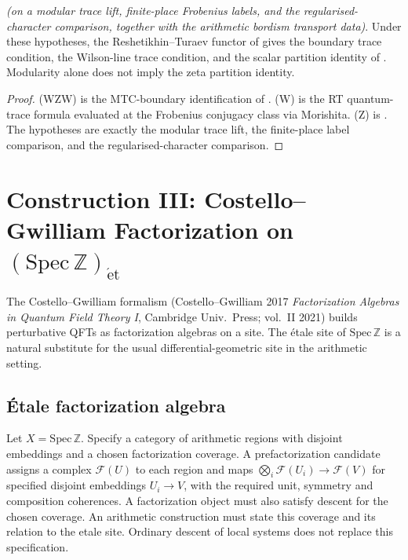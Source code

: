 \begin{theorem}
\label{v4-arith:w10-a:thm:construction-II-closure}
\ClaimStatusProvedHereConditional \emph{(on a modular trace lift,
finite-place Frobenius labels, and the regularised-character
comparison, together with the arithmetic bordism transport data)}.
Under these hypotheses, the Reshetikhin--Turaev functor
of  gives the boundary trace
condition, the Wilson-line trace condition, and the scalar partition
identity of . Modularity alone does
not imply the zeta partition identity.
\end{theorem}

\begin{proof}
(WZW) is the MTC-boundary identification of
. (W) is the RT quantum-trace
formula evaluated at the Frobenius conjugacy class via Morishita.
(Z) is . The hypotheses are exactly
the modular trace lift, the finite-place label comparison, and the
regularised-character comparison.
\end{proof}

\section{Construction III: Costello--Gwilliam Factorization on \texorpdfstring{\((\mathrm{Spec}\,\mathbb{Z})_{\mathrm{\acute et}}\)}{the etale site}}
\label{v4-arith:w10-a:construction-III}

The Costello--Gwilliam formalism
(Costello--Gwilliam 2017 \emph{Factorization Algebras in Quantum
Field Theory I}, Cambridge Univ.~Press; vol.~II 2021) builds
perturbative QFTs as factorization algebras on a site. The
\'etale site of \(\mathrm{Spec}\,\mathbb Z\) is a natural substitute
for the usual differential-geometric site in the arithmetic
setting.

\subsection{\'Etale factorization algebra}
\label{v4-arith:w10-a:CG-etale}

\begin{definition}
\label{v4-arith:w10-a:def:CG-prefactor}
Let $X=\mathrm{Spec}\,\mathbb Z$. Specify a category of arithmetic
regions with disjoint embeddings and a chosen factorization coverage.
A prefactorization candidate assigns a complex $\mathcal F(U)$ to each
region and maps $\bigotimes_i\mathcal F(U_i)\to\mathcal F(V)$ for
specified disjoint embeddings $U_i\to V$, with the required unit,
symmetry and composition coherences. A factorization object must also
satisfy descent for the chosen coverage. An arithmetic construction
must state this coverage and its relation to the etale site.
Ordinary descent of local systems does not replace this specification.
\end{definition}


